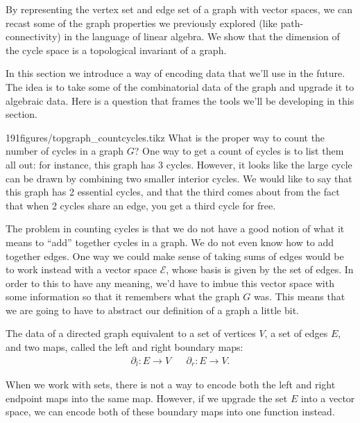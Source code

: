 \begin{elevator}
By representing the vertex set and edge set of a graph with vector spaces, we can recast some of the graph properties we previously explored (like path-connectivity) in the language of linear algebra. 
We show that the dimension of the cycle space is a topological invariant of a graph.
\end{elevator}
\label{sec:graph:cyclespace}
In this section we introduce a way of encoding data that we'll use in the future. The idea is to take some of the combinatorial data of the graph and upgrade it to algebraic data. Here is a question that frames the tools we'll be developing in this section. 
\begin{examplefigureenv}{191figures/topgraph_countcycles.tikz}
	\label{fig:cyclecount}
What is the proper way to count the number of cycles in a graph $G$?
One way to get a count of cycles is to list them all out: for instance, this graph has 3 cycles. However, it looks like the large cycle can be drawn by combining  two smaller interior cycles. We would like to say that  this graph  has 2 essential cycles, and that the third comes about from the fact that when 2 cycles share an edge, you get a third cycle for free. 
\end{examplefigureenv}

The problem in counting cycles is that we do not have a good notion of what it means to ``add'' together cycles in a graph.
We do not even know how to add together edges.
One way we could make sense of taking sums of edges would be to work instead with a vector space $\mathcal E$, whose basis is given by the set of edges.
In order to this to have any meaning, we'd have to imbue this vector space with some information so that it remembers what the graph $G$ was. This means that we are going to have to abstract our definition of a graph a little bit.
\begin{claim}
The data of a directed graph equivalent to a set of vertices $V$, a set of edges $E$, and two maps, called the left and right boundary maps: \begin{align*}\partial_l : E\to V && \partial_r: E\to V.
\end{align*}
\end{claim} 
When we work with sets, there is not a way to encode both the left and right endpoint maps into the same map. However, if we upgrade the set $E$ into a vector space, we can encode both of these boundary maps into one function instead. 
